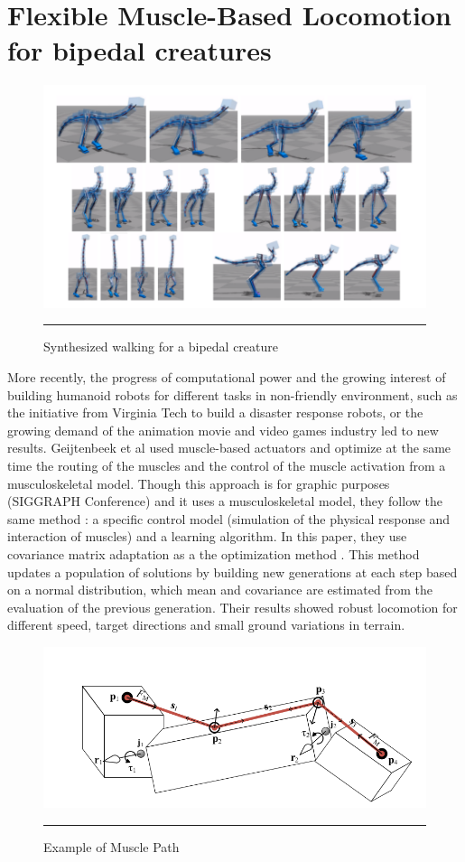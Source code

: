 \section{Flexible Muscle-Based Locomotion for bipedal creatures}

\begin{figure}[htbp]
    \centering
    \includegraphics[scale=0.3]{Figures/synthesized_walking.png}
    \rule{35em}{0.5pt}
    \caption[Synthesized walking for a bipedial creature]{Synthesized walking for a bipedal creature}
    \label{fig:synthesized_walking}
\end{figure}

More recently, the progress of computational power and the growing interest of building humanoid robots for different tasks in non-friendly environment, such as the initiative from Virginia Tech to build a disaster response robots, or the growing demand of the animation movie and video games industry led to new results. Geijtenbeek et al \cite{MuscleBasedBipeds} used muscle-based actuators and optimize at the same time the routing of the muscles and the control of the muscle activation from a musculoskeletal model. Though this approach is for graphic purposes (SIGGRAPH Conference) and it uses a musculoskeletal model, they follow the same method : a specific control model (simulation of the physical response and interaction of muscles) and a learning algorithm. In this paper, they use covariance matrix adaptation as a the optimization method \cite{igel2007covariance}. This method updates a population of solutions by building new generations at each step based on a normal distribution, which mean and covariance are estimated from the evaluation of the previous generation. Their results showed robust locomotion for different speed, target directions and small ground variations in terrain.

\begin{figure}[htbp]
    \centering
    \includegraphics[scale=0.2]{Figures/muscle_based.png}
    \rule{35em}{0.5pt}
    \caption[Example of Muscle Path]{Example of Muscle Path}
    \label{fig:muscle_based}
\end{figure}


